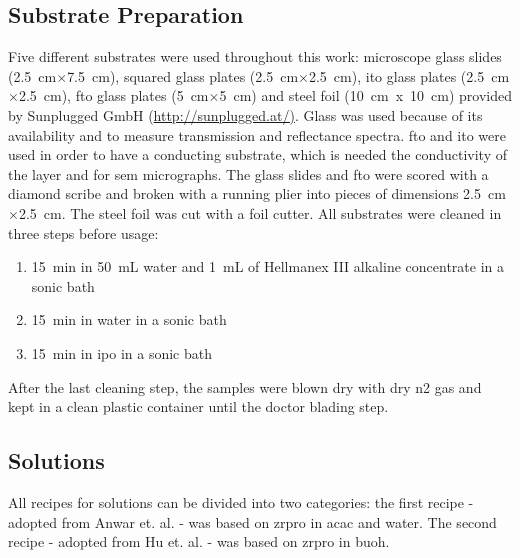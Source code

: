 \documentclass[a4paper]{article}
\newcommand{\td}[1]{\textcolor{red}{#1}}
\newcommand{\ds}[1]{}
\newcommand{\x}{$\times$}
\newcommand{\cm}[1]{\SI{#1}{\centi\meter}}
\newcommand{\ml}[1]{\SI{#1}{\milli\liter}}
\newcommand{\minutes}[1]{\SI{#1}{\minute}}
\begin{document}
\subsection{Substrate Preparation}
Five different substrates were used throughout this work: 
microscope glass slides (\cm{2.5}\x\cm{7.5})\ds{ from Sigma Aldrich},\ds{ thinner,} squared glass plates (\cm{2.5}\x\cm{2.5})\ds{ from Sigma Aldrich}, \gls{ito} glass plates (\cm{2.5}\x\cm{2.5})\ds{ from Sigma Aldrich}, \gls{fto} glass plates (\cm{5}\x\cm{5})\ds{ from Sigma Aldrich} and steel foil (10~cm~x~10~cm) provided by Sunplugged GmbH (\url{http://sunplugged.at/)}.
%
Glass was used because of its availability and to measure transmission and reflectance 
spectra. \gls{fto} and \gls{ito} were used in order to have a conducting substrate, which
is needed the conductivity of the layer and for \gls{sem} micrographs.
The glass slides and \gls{fto} were scored with a diamond scribe \ds{\td{(diamond scratcher/scraper)} }and broken with a running plier into pieces of dimensions \cm{2.5}\x\cm{2.5}.
The steel foil was cut with a foil cutter.
All substrates were cleaned in three steps before usage:
\begin{enumerate}
	\item \minutes{15} in \ml{50} \gls{water} and \ml{1} of Hellmanex III alkaline concentrate in a sonic bath
	\item \minutes{15} in \gls{water} in a sonic bath
	\item \minutes{15} in \gls{ipo} in a sonic bath 
\end{enumerate}
After the last cleaning step, the samples were blown dry with dry \gls{n2} gas and kept in a clean plastic container until the doctor blading step.

\subsection{Solutions}
All recipes for solutions can be divided into two categories:
the first recipe - adopted from Anwar et. al. \cite{Anwar2017} - was based on \gls{zrpro} in \gls{acac} and \gls{water}.
The second recipe - adopted from Hu et. al. \cite{Hu2016} - was based on \gls{zrpro} in \gls{buoh}.
\end{document}
